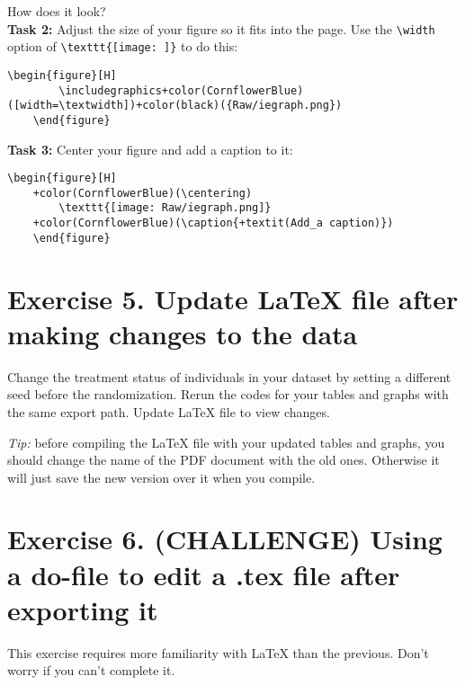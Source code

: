 \documentclass[12pts]{report}
\begin{document}
How does it look? \\

\textbf{Task 2:} Adjust the size of your figure so it fits into the page. Use the \verb|\width| option of \verb|\texttt{[image: ]}| to do this:
\begin{center}
	\begin{Verbatim}[commandchars=+\(\)]
	\begin{figure}[H]
		\includegraphics+color(CornflowerBlue)([width=\textwidth])+color(black)({Raw/iegraph.png})
	\end{figure}
	\end{Verbatim}
\end{center}

\textbf{Task 3:} Center your figure and add a caption to it:
\begin{center}
	\begin{Verbatim}[commandchars=+\(\)]
	\begin{figure}[H]
	+color(CornflowerBlue)(\centering)
		\texttt{[image: Raw/iegraph.png]}
	+color(CornflowerBlue)(\caption{+textit(Add_a caption)})
	\end{figure}
	\end{Verbatim}
\end{center}

\section*{Exercise 5. Update {\LaTeX} file after making changes to the data}
Change the treatment status of individuals in your dataset by setting a different seed before the randomization. Rerun the codes for your tables and graphs with the same export path. Update {\LaTeX} file to view changes.

\begin{center}
	\textcolor{BurntOrange}{\emph{Tip:} before compiling the {\LaTeX} file with your updated tables and graphs, you should change the name of the PDF document with the old ones. Otherwise it will just save the new version over it when you compile.}
\end{center}

\section*{Exercise 6. (CHALLENGE) Using a do-file to edit a .tex file after exporting it}

This exercise requires more familiarity with {\LaTeX} than the previous. Don't worry if you can't complete it. \\
\end{document}
